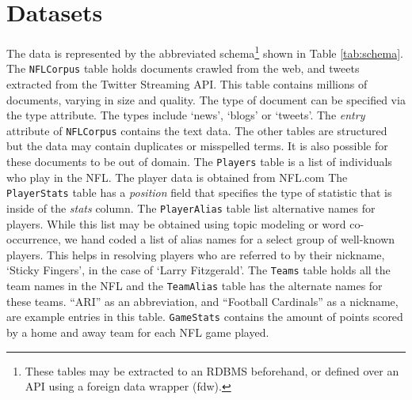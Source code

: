 \section{Datasets}
The data is represented by the abbreviated schema\footnote{These tables may be
extracted to an RDBMS beforehand, or defined over an API
using a foreign data wrapper (fdw).} shown in Table \ref{tab:schema}.
The {\tt NFLCorpus} table holds documents crawled from the web,
and tweets extracted from the Twitter Streaming API. This table contains
millions of documents, varying in size and quality. The type of document 
can be specified via the type attribute. The types include `news', `blogs' or
`tweets'. The \textit{entry} attribute of {\tt NFLCorpus} contains the text data.
The other tables are structured but the data may contain duplicates or
misspelled terms. It is also possible for these documents to be out of domain.
The {\tt Players} table is a list of individuals
who play in the NFL. The player data is obtained from NFL.com
The {\tt PlayerStats} table has a \textit{position} field that specifies
the type of statistic that is inside of the \textit{stats} column.
The {\tt PlayerAlias} table list alternative names for players.
While this list may be obtained using topic modeling or word
co-occurrence, we hand coded a list of alias names for a select
group of well-known players. This helps in resolving players who are
referred to by their nickname, `Sticky Fingers', in the case of
`Larry Fitzgerald'.
The {\tt Teams} table holds all the team
names in the NFL and the {\tt TeamAlias} table has the alternate names for these
teams. ``ARI'' as an abbreviation,  and ``Football Cardinals'' as a nickname, are 
example entries in this table. {\tt GameStats} contains the amount of points scored by a 
home and away team for each NFL game played.\\